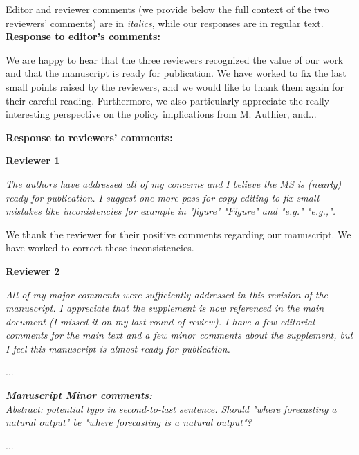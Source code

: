 \documentclass[11pt,letter]{article}
\begin{document}
\setlength{\parindent}{0cm}
\setlength{\parskip}{7pt}

Editor and reviewer comments (we provide below the full context of the two reviewers' comments) are in \emph{italics}, while our responses are in regular text. \\ 

{\bf Response to editor's comments:} 

We are happy to hear that the three reviewers recognized the value of our work and that the manuscript is ready for publication. We have worked to fix the last small points raised by the reviewers, and we would like to thank them again for their careful reading. Furthermore, we also particularly appreciate the really interesting perspective on the policy implications from M. Authier, and...

{\bf Response to reviewers' comments:} 

{\bf Reviewer 1}

\begin{mybox}
\emph{The authors have addressed all of my concerns and I believe the MS is
(nearly) ready for publication. I suggest one more pass for copy editing
to fix small mistakes like inconistencies for example in "figure"
"Figure" and "e.g." "e.g.,".}
\end{mybox}

We thank the reviewer for their positive comments regarding our manuscript. 
We have worked to correct these inconsistencies.

{\bf Reviewer 2}

\begin{mybox}
\emph{All of my major comments were sufficiently addressed in this revision of
the manuscript. I appreciate that the supplement is now referenced in
the main document (I missed it on my last round of review). I have a few
editorial comments for the main text and a few minor comments about the
supplement, but I feel this manuscript is almost ready for publication.}
\end{mybox}

...

\begin{mybox}
\emph{\textbf{Manuscript Minor comments:}\\
Abstract: potential typo in second-to-last sentence. Should "where
forecasting a natural output" be "where forecasting is a natural output"?}
\end{mybox}
...
\end{document}
